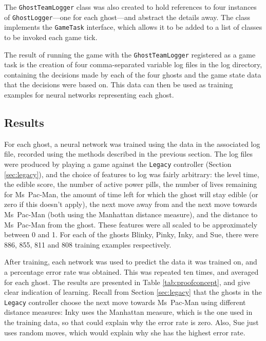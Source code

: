 The {\tt GhostTeamLogger} class was also created to hold references to four instances of {\tt GhostLogger}---one for each ghost---and abstract the details away.  The class implements the {\tt GameTask} interface, which allows it to be added to a list of classes to be invoked each game tick.

The result of running the game with the {\tt GhostTeamLogger} registered as a game task is the creation of four comma-separated variable log files in the log directory, containing the decisions made by each of the four ghosts and the game state data that the decisions were based on.  This data can then be used as training examples for neural networks representing each ghost.

\subsection{Results}
\label{sec:conceptresults}

For each ghost, a neural network was trained using the data in the associated log file, recorded using the methods described in the previous section.  The log files were produced by playing a game against the {\tt Legacy} controller (Section \ref{sec:legacy}), and the choice of features to log was fairly arbitrary: the level time, the edible score, the number of active power pills, the number of lives remaining for Ms~Pac-Man, the amount of time left for which the ghost will stay edible (or zero if this doesn't apply), the next move away from and the next move towards Ms~Pac-Man (both using the Manhattan distance measure), and the distance to Ms~Pac-Man from the ghost.  These features were all scaled to be approximately between 0 and 1.  For each of the ghosts Blinky, Pinky, Inky, and Sue, there were 886, 855, 811 and 808 training examples respectively.

After training, each network was used to predict the data it was trained on, and a percentage error rate was obtained.  This was repeated ten times, and averaged for each ghost.  The results are presented in Table \ref{tab:proofconcept}, and give clear indication of learning.  Recall from Section \ref{sec:legacy} that the ghosts in the {\tt Legacy} controller choose the next move towards Ms~Pac-Man using different distance measures: Inky uses the Manhattan measure, which is the one used in the training data, so that could explain why the error rate is zero.  Also, Sue just uses random moves, which would explain why she has the highest error rate.

